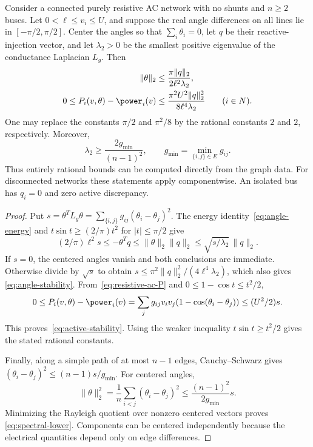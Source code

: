 \begin{proposition}
\label{prop:reactive-stability}
Consider a connected purely resistive AC network with no shunts and $n\ge2$
buses. Let $0<\ell\le v_i\le U$, and suppose the real angle differences on
all lines lie in $[-\pi/2,\pi/2]$. Center the angles so that
$\sum_i\theta_i=0$, let $q$ be their reactive-injection vector, and let
$\lambda_2>0$ be the smallest positive eigenvalue of the conductance
Laplacian $L_g$. Then
\begin{align}
 \|\theta\|_2&\le
       \frac{\pi\|q\|_2}{2\ell^2\lambda_2},
       \label{eq:angle-stability}\\
 0\le P_i(v,\theta)-\power_i(v)&\le
       \frac{\pi^2U^2\|q\|_2^2}{8\ell^4\lambda_2}
       \qquad(i\in N).
       \label{eq:active-stability}
\end{align}
One may replace the constants $\pi/2$ and $\pi^2/8$ by the rational
constants $2$ and $2$, respectively. Moreover,
\begin{equation}
 \lambda_2\ge\frac{2g_{\min}}{(n-1)^2},
 \qquad g_{\min}=\min_{\{i,j\}\in E}g_{ij}.
 \label{eq:spectral-lower}
\end{equation}
Thus entirely rational bounds can be computed directly from the graph data.
For disconnected networks these statements apply componentwise. An isolated
bus has $q_i=0$ and zero active discrepancy.
\end{proposition}
\begin{proof}
Put $s=\theta^TL_g\theta=\sum_{\{i,j\}}g_{ij}(\theta_i-\theta_j)^2$.
The energy identity~\eqref{eq:angle-energy} and
$t\sin t\ge(2/\pi)t^2$ for $|t|\le\pi/2$ give
\[
 (2/\pi)\ell^2s\le-\theta^Tq
       \le\|\theta\|_2\|q\|_2
       \le\sqrt{s/\lambda_2}\,\|q\|_2.
\]
If $s=0$, the centered angles vanish and both conclusions are immediate.
Otherwise divide by $\sqrt s$ to obtain
$s\le\pi^2\|q\|_2^2/(4\ell^4\lambda_2)$, which also gives
\eqref{eq:angle-stability}. From~\eqref{eq:resistive-ac-P} and
$0\le1-\cos t\le t^2/2$,
\[
 0\le P_i(v,\theta)-\power_i(v)
   =\sum_jg_{ij}v_iv_j(1-\cos(\theta_i-\theta_j))
   \le (U^2/2)s.
\]
This proves~\eqref{eq:active-stability}. Using the weaker inequality
$t\sin t\ge t^2/2$ gives the stated rational constants.

Finally, along a simple path of at most $n-1$ edges, Cauchy--Schwarz gives
$(\theta_i-\theta_j)^2\le(n-1)s/g_{\min}$.
For centered angles,
\[
 \|\theta\|_2^2=\frac1n\sum_{i<j}(\theta_i-\theta_j)^2
       \le\frac{(n-1)^2}{2g_{\min}}s.
\]
Minimizing the Rayleigh quotient over nonzero centered vectors proves
\eqref{eq:spectral-lower}. Components can be centered independently because
the electrical quantities depend only on edge differences.
\end{proof}

